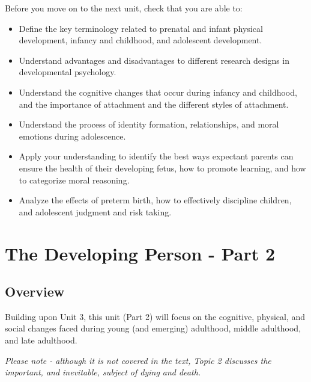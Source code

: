 \documentclass[
]{book}
\providecommand{\tightlist}{%
  \setlength{\itemsep}{0pt}\setlength{\parskip}{0pt}}
\begin{document}
\begin{progress}
Before you move on to the next unit, check that you are able to:

\begin{itemize}
\tightlist
\item
  Define the key terminology related to prenatal and infant physical development, infancy and childhood, and adolescent development.\\
\item
  Understand advantages and disadvantages to different research designs in developmental psychology.\\
\item
  Understand the cognitive changes that occur during infancy and childhood, and the importance of attachment and the different styles of attachment.\\
\item
  Understand the process of identity formation, relationships, and moral emotions during adolescence.\\
\item
  Apply your understanding to identify the best ways expectant parents can ensure the health of their developing fetus, how to promote learning, and how to categorize moral reasoning.\\
\item
  Analyze the effects of preterm birth, how to effectively discipline children, and adolescent judgment and risk taking.
\end{itemize}
\end{progress}

\hypertarget{the-developing-person---part-2}{%
\chapter{The Developing Person - Part 2}\label{the-developing-person---part-2}}

\hypertarget{overview-3}{%
\section*{Overview}\label{overview-3}}

Building upon Unit 3, this unit (Part 2) will focus on the cognitive, physical, and social changes faced during young (and emerging) adulthood, middle adulthood, and late adulthood.

\emph{Please note - although it is not covered in the text, Topic 2 discusses the important, and inevitable, subject of dying and death.}
\end{document}
